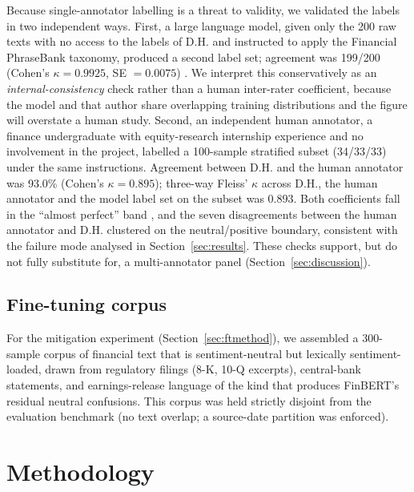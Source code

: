 \documentclass{aims}
\numberwithin{equation}{section}
\begin{document}
Because single-annotator labelling is a threat to validity, we validated the labels
in two independent ways. First, a large language model, given only the 200 raw
texts with no access to the labels of D.H. and instructed to apply the Financial
PhraseBank taxonomy, produced a second label set; agreement was 199/200 (Cohen's
$\kappa = 0.9925$, SE $= 0.0075$) \citep{cohen1960}. We interpret this conservatively
as an \emph{internal-consistency} check rather than a human inter-rater coefficient,
because the model and that author share overlapping training distributions and the
figure will overstate a human study. Second, an independent human annotator, a
finance undergraduate with equity-research internship experience and no involvement
in the project, labelled a 100-sample stratified subset (34/33/33) under the same
instructions. Agreement between D.H. and the human annotator was 93.0\% (Cohen's
$\kappa = 0.895$); three-way Fleiss' $\kappa$ \citep{fleiss1971} across D.H., the
human annotator and the model label set on the subset was 0.893. Both coefficients
fall in the ``almost perfect'' band \citep{landis1977}, and the seven disagreements
between the human annotator and D.H. clustered on the neutral/positive boundary,
consistent with the failure
mode analysed in Section~\ref{sec:results}. These checks support, but do not fully
substitute for, a multi-annotator panel (Section~\ref{sec:discussion}).

\subsection{Fine-tuning corpus}\label{sec:ftcorpus}
For the mitigation experiment (Section~\ref{sec:ftmethod}), we assembled a
300-sample corpus of financial text that is sentiment-neutral but lexically
sentiment-loaded, drawn from regulatory filings (8-K, 10-Q excerpts), central-bank
statements, and earnings-release language of the kind that produces FinBERT's
residual neutral confusions. This corpus was held strictly disjoint from the
evaluation benchmark (no text overlap; a source-date partition was enforced).

\section{Methodology}\label{sec:method}
\end{document}
